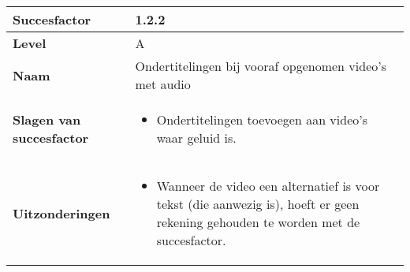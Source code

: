 \begin{table}[H]
    \centering
    \hspace*{-1cm}\begin{tabular}{|l|p{12cm}|} 
        \hline
        \textbf{Succesfactor}                & 1.2.2                                                                                                                                                                                                                                                                                                             \\ 
        \hline
        \textbf{Level}                       & A                                                                                                                                                                                                                                                                                                                                                                             \\ 
        \hline
        \textbf{Naam}                        & Ondertitelingen bij vooraf opgenomen video’s met audio~                                                                                                                                                                                                                                                                                                                                                            \\ 
        \hline
        \textbf{Slagen van succesfactor}     & \begin{itemize}
            \item Ondertitelingen toevoegen aan video’s waar geluid is.
        \end{itemize}                                                                                                                                                                                                      \\ 
        \hline
        \textbf{Uitzonderingen}     & \begin{itemize}
            \item Wanneer de video een alternatief is voor tekst (die aanwezig is), hoeft er geen rekening gehouden te worden met de succesfactor.
        \end{itemize}                                                                                                                                                                                                      \\ 

\end{tabular}
\end{table}
